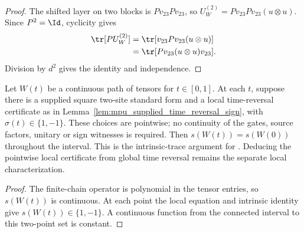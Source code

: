 \begin{proof}\leanok
    The shifted layer on two blocks is $P v_{23}P v_{23}$, so
    $U_W^{(2)}=P v_{23}P v_{23}(u\otimes u)$. Since $P^2=\Id$,
    cyclicity gives
    \begin{align}
        \tr[P U_W^{(2)}]
         & =\tr[v_{23}P v_{23}(u\otimes u)]  \\
         & =\tr[P v_{23}(u\otimes u)v_{23}].
    \end{align}
    Division by $d^2$ gives the identity and independence.
\end{proof}

\begin{lemma}
    \label{lem:mpu_supplied_time_reversal_sign_constant}
    \leanok
    Let $W(t)$ be a continuous path of tensors for $t\in[0,1]$.
    At each $t$, suppose there is a supplied square two-site standard form
    and a local time-reversal certificate as in
    Lemma~\ref{lem:mpu_supplied_time_reversal_sign}, with
    $\sigma(t)\in\{1,-1\}$. These choices are pointwise; no continuity
    of the gates, source factors, unitary or sign witnesses is required.
    Then $s(W(t))=s(W(0))$ throughout the interval.
    This is the intrinsic-trace argument for
    \cite[lines~1628--1630]{Cirac2017MPU}. Deducing the pointwise local
    certificate from global time reversal remains the separate local
    characterization.
\end{lemma}

\begin{proof}\leanok
    The finite-chain operator is polynomial in the tensor entries,
    so $s(W(t))$ is continuous. At each point the local equation and
    intrinsic identity give $s(W(t))\in\{1,-1\}$. A continuous function
    from the connected interval to this two-point set is constant.
\end{proof}

